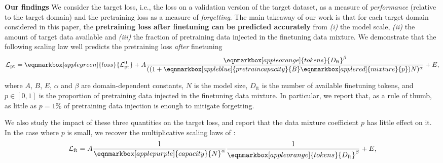 \textbf{Our findings} We consider the target loss, i.e., the loss on a validation version of the target dataset, as a measure of \textit{performance} (relative to the target domain) and the pretraining loss as a measure of \textit{forgetting}. The main takeaway of our work is that for each target domain considered in this paper, the \textbf{pretraining loss after finetuning can be predicted accurately} from \textit{(i)} the model scale, \textit{(ii)} the amount of target data available and \textit{(iii)} the fraction of pretraining data injected in the finetuning data mixture.
We demonstrate that the following scaling law well predicts the pretraining loss \emph{after} finetuning
\vspace{0.9em}
\begin{equation}
\mathcal{L}_{\mathrm{pt}} 
    = \eqnmarkbox[applegreen]{loss}{\mathcal{L}_{\mathrm{pt}}^0} + A\frac{\eqnmarkbox[appleorange]{tokens}{D_{\mathrm{ft}}}^{\beta}}{((1+\eqnmarkbox[appleblue]{pretraincapacity}{B}\eqnmarkbox[applered]{mixture}{p})N)^{\alpha}} + E,    
\label{eq:scalinglaw}
\end{equation}

where $A$, $B$, $E$, $\alpha$ and $\beta$ are domain-dependent constants, $N$ is the model size, $D_{\mathrm{ft}}$ is the number of available finetuning tokens, and $p\in[0, 1]$ is the proportion of pretraining data injected in the finetuning data mixture.
In particular, we report that, as a rule of thumb, as little as $p=1\%$ of pretraining data injection is enough to mitigate forgetting.

We also study the impact of these three quantities on the target loss, and report that the data mixture coefficient $p$ has little effect on it. 
In the case where $p$ is small, we recover the multiplicative scaling laws of \citet{zhang2024when}:
\begin{equation}
\mathcal{L}_{\mathrm{ft}} 
    = A\frac{1}{\eqnmarkbox[applepurple]{capacity}{N}^{\alpha}} 
    \frac{1}{\eqnmarkbox[appleorange]{tokens}{D_{\mathrm{ft}}}^{\beta}} + {E},    
\end{equation}



